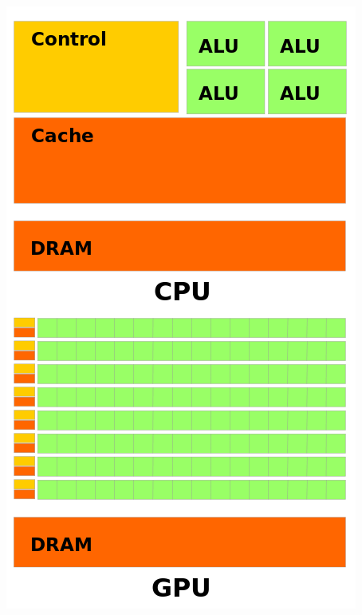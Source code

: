 \documentclass{beamer}
\begin{document}
\begin{frame}[t,fragile]
\begin{columns}[onlytextwidth]
		\begin{column}{0.3\textwidth}
			\includegraphics[width=\textwidth]{img/cpu-gpu.png}
		\end{column}
	\end{columns}				
			
	\end{frame}
	
	
\end{document}
